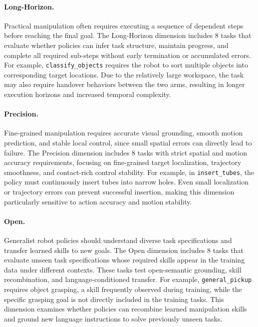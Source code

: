 \paragraph{Long-Horizon.}
Practical manipulation often requires executing a sequence of dependent steps before reaching the final goal. The Long-Horizon dimension includes 8 tasks that evaluate whether policies can infer task structure, maintain progress, and complete all required sub-steps without early termination or accumulated errors. For example, \texttt{classify\_objects} requires the robot to sort multiple objects into corresponding target locations. Due to the relatively large workspace, the task may also require handover behaviors between the two arms, resulting in longer execution horizons and increased temporal complexity.

\paragraph{Precision.}
Fine-grained manipulation requires accurate visual grounding, smooth motion prediction, and stable local control, since small spatial errors can directly lead to failure. The Precision dimension includes 8 tasks with strict spatial and motion accuracy requirements, focusing on fine-grained target localization, trajectory smoothness, and contact-rich control stability. For example, in \texttt{insert\_tubes}, the policy must continuously insert tubes into narrow holes. Even small localization or trajectory errors can prevent successful insertion, making this dimension particularly sensitive to action accuracy and motion stability.

\paragraph{Open.}
Generalist robot policies should understand diverse task specifications and transfer learned skills to new goals. The Open dimension includes 8 tasks that evaluate unseen task specifications whose required skills appear in the training data under different contexts. These tasks test open-semantic grounding, skill recombination, and language-conditioned transfer. For example, \texttt{general\_pickup} requires object grasping, a skill frequently observed during training, while the specific grasping goal is not directly included in the training tasks. This dimension examines whether policies can recombine learned manipulation skills and ground new language instructions to solve previously unseen tasks.


